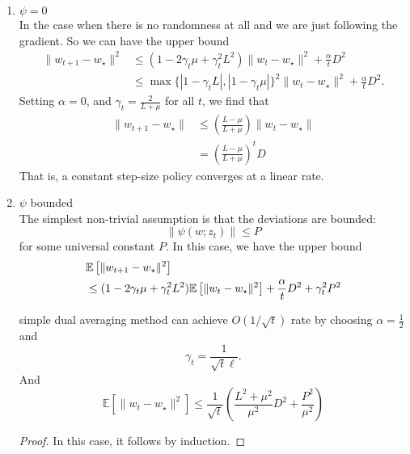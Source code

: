 \begin{enumerate}
	\item  {$\psi=0$}\\
	In the case when there is no randomness at all and we are just following the gradient.
	So we can have the upper bound
	\begin{equation}
		\begin{split}
			\|w_{t+1}-w_\star\|^2
			&\leq(1-2\gamma_t\mu+\gamma_t^2L^2)\|w_t-w_\star\|^2
			+\frac{\alpha}{t}D^2\\
			&\leq \max\{ |1-\gamma_t L|,|1-\gamma_t \mu|  \}^2 \|w_t-w_\star\|^2
			+\frac{\alpha}{t}D^2.
		\end{split}
	\end{equation}
	Setting $\alpha=0$, and $\gamma_t=\frac{2}{L+\mu}$ for all $t$, we find that
	\begin{align}
		\|w_{t+1}-w_\star\| &\leq \left( \frac{L-\mu}{L+\mu} \right)\|w_t-w_\star\|\\
		&=\left( \frac{L-\mu}{L+\mu} \right)^t D
	\end{align}
	That is, a constant step-size policy converges at a linear rate.
	
	\item {$\psi$ bounded}\\
	The simplest non-trivial assumption is that the deviations are bounded:
	\begin{equation}
		\|\psi(w;z_t)\| \leq P
	\end{equation}
	for some universal constant $P$.
	In this case, we have the upper bound
	\begin{align}
		\notag
		&\mathbb{E}\left[\|w_{t+1}-w_\star\|^2 \right]\\
		&\leq(1-2\gamma_t\mu+\gamma_t^2L^2)\mathbb{E}\left[\|w_t-w_\star\|^2 \right]
		+\frac{\alpha}{t}D^2
		+\gamma_t^2 P^2
	\end{align}
	\begin{theorem}
		simple dual averaging method can achieve $O(1/\sqrt{t})$ rate by choosing $\alpha=\frac{1}{2}$ and 
		\begin{equation}
			\gamma_t=\frac{1}{\sqrt{t}\ell}.
		\end{equation}
		And
		\begin{equation}
			\mathbb{E}\left[\|w_{t}-w_\star\|^2 \right]\leq
			\frac{1}{\sqrt{t}}
			\left(\frac{L^2+\mu^2}{\mu^2} D^2+\frac{P^2}{\mu^2}\right)
		\end{equation}
	\end{theorem}
	\begin{proof}
		In this case, it follows by induction.
		

\end{proof}
\end{enumerate}
